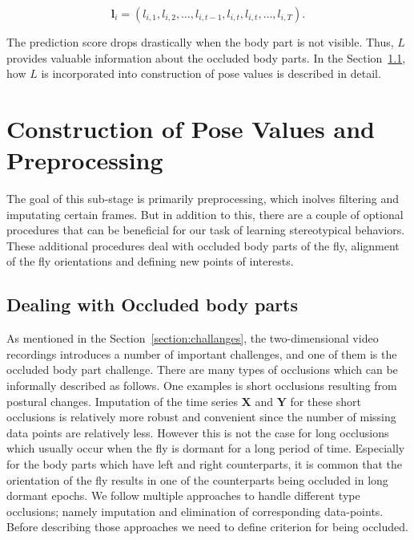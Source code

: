 \begin{equation*}
	\mathbf{l}_i = (l_{i,1}, l_{i,2}, \dots, l_{i,t-1}, l_{i,t}, l_{i,t}, \dots, l_{i,T}).
\end{equation*}

The prediction score drops drastically when the body part is not visible. Thus, $L$ provides valuable information about the occluded body parts. In the Section~\ref{section:dealing_with_occluded_body parts}, how $L$ is incorporated into construction of pose values is described in detail.

\section{Construction of Pose Values and Preprocessing}
The goal of this sub-stage is primarily preprocessing, which inolves filtering and imputating certain frames.
But in addition to this, there are a couple of optional procedures that can be beneficial for our task of learning stereotypical behaviors.
These additional procedures deal with occluded body parts of the fly, alignment of the fly orientations and defining new points of interests.

\subsection{Dealing with Occluded body parts}\label{section:dealing_with_occluded_body parts}
As mentioned in the Section~\ref{section:challanges}, the two-dimensional video recordings introduces a number of important challenges, and one of them is the occluded body part challenge.
There are many types of occlusions which can be informally described as follows.
One examples is short occlusions resulting from postural changes.
Imputation of the time series $\mathbf{X}$ and $\mathbf{Y}$ for these short occlusions is relatively more robust and convenient since the number of missing data points are relatively less.
However this is not the case for long occlusions which usually occur when the fly is dormant for a long period of time.
Especially for the body parts which have left and right counterparts, it is common that the orientation of the fly results in one of the counterparts being occluded in long dormant epochs.
We follow multiple approaches to handle different type occlusions; namely imputation and elimination of corresponding data-points.
Before describing those approaches we need to define criterion for being occluded.

